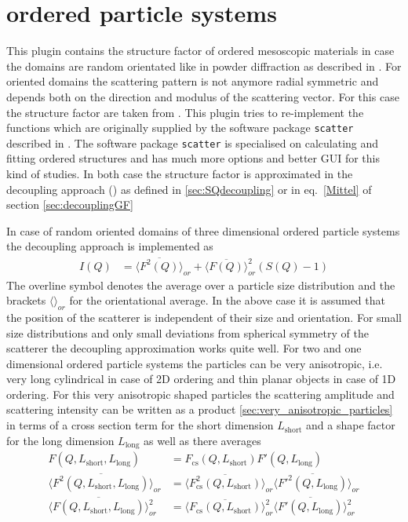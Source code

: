 \section{ordered particle systems} \hspace{1pt}
\label{sec:ops}
This plugin contains the structure factor of ordered mesoscopic materials in case the domains are random orientated like in powder diffraction as described in \cite{Forster2005}. For oriented domains the scattering pattern is not anymore radial symmetric and depends both on the direction and modulus of the scattering vector. For this case the structure factor are taken from  \cite{Forster2011}. This plugin tries to re-implement the functions which are originally supplied by the software package \texttt{scatter} described in \cite{Forster2010}. The software package \texttt{scatter} is specialised on calculating and fitting ordered structures and has much more options and better GUI for this kind of studies. In both case the structure factor is approximated in the decoupling approach (\cite{Kotlarchyk1983}) as defined in \ref{sec:SQdecoupling} or in eq.\ \ref{Mittel} of section \ref{sec:decouplingGF}

In case of random oriented domains of three dimensional ordered particle systems the decoupling approach is implemented as
\begin{align}
I(Q) &= \langle\overline{F^2(Q)}\rangle_{or} + \langle\overline{F(Q)}\rangle_{or}^2 (S(Q)-1)
\end{align}
The overline symbol denotes the average over a particle size distribution and the brackets $\langle\rangle_{or}$ for the orientational average. In the above case it is assumed that the position of the scatterer is independent
of their size and orientation. For small size distributions and only small deviations from spherical symmetry of the scatterer the decoupling approximation works quite well.
For two and one dimensional ordered particle systems the particles can be very anisotropic, i.e.  very long cylindrical in case of 2D ordering and thin planar objects in case of 1D ordering. For this very anisotropic shaped particles the scattering amplitude and scattering intensity can be written as a product \ref{sec:very_anisotropic_particles} in terms of a cross section term for the short dimension $L_\mathrm{short}$ and a shape factor for the long dimension $L_\mathrm{long}$ as well as there averages
\begin{subequations}
\begin{align}
F(Q,L_\mathrm{short},L_\mathrm{long}) &= F_\mathrm{cs}(Q,L_\mathrm{short}) F'(Q,L_\mathrm{long}) \\
\langle\overline{F^2(Q,L_\mathrm{short},L_\mathrm{long})}\rangle_{or} &= \langle\overline{F^2_\mathrm{cs}(Q,L_\mathrm{short})}\rangle_{or} \langle\overline{F'^2(Q,L_\mathrm{long})}\rangle_{or} \\
\langle\overline{F(Q,L_\mathrm{short},L_\mathrm{long})}\rangle_{or}^2 &= \langle\overline{F_\mathrm{cs}(Q,L_\mathrm{short})}\rangle_{or}^2 \langle\overline{F'(Q,L_\mathrm{long})}\rangle_{or}^2
\end{align}
\end{subequations}

